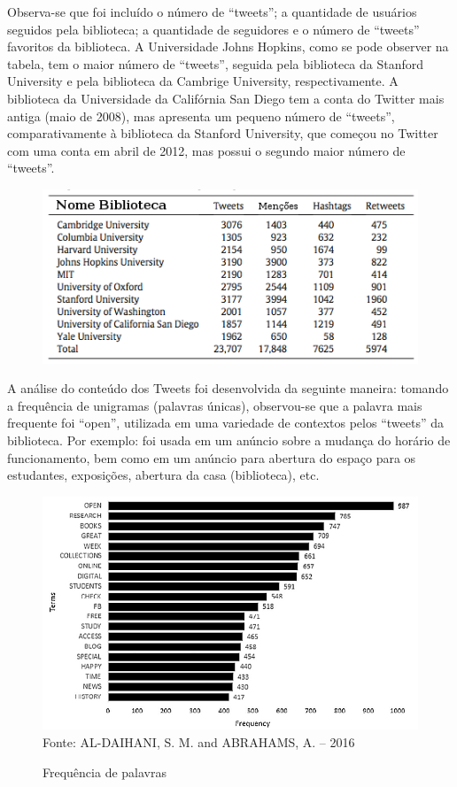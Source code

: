Observa-se que foi incluído o número de ``tweets''; a quantidade de usuários seguidos pela biblioteca; a quantidade de seguidores e o número de ``tweets'' favoritos da biblioteca. A Universidade Johns Hopkins, como se pode observer na tabela, tem o maior número de
``tweets'', seguida pela biblioteca da Stanford University e pela biblioteca da Cambrige University, respectivamente. A biblioteca da Universidade da Califórnia San Diego tem a conta do Twitter mais antiga (maio de 2008), mas apresenta um pequeno número de ``tweets'',
comparativamente à biblioteca da Stanford University, que começou no Twitter com uma conta em abril de 2012, mas possui o segundo maior número de ``tweets''. 


\begin{figure}
\centering
\includegraphics[width=0.7\linewidth]{Figuras/Twitter/contaPalavras}
\caption{}
\label{fig:contaPalavras}
\end{figure}

\pagebreak

A análise do conteúdo dos Tweets foi desenvolvida da seguinte maneira: tomando a frequência de unigramas (palavras únicas), observou-se que a palavra mais frequente foi “open”, utilizada em uma variedade de contextos pelos ``tweets'' da biblioteca. Por exemplo: foi usada em um anúncio sobre a mudança do horário de funcionamento, bem como em um anúncio para abertura do espaço para os estudantes, exposições, abertura da casa (biblioteca), etc. 

\begin{figure}[ht]
	\centering
	\caption{Frequência de palavras}
	\includegraphics[width=0.6\linewidth]{Figuras/Twitter/ferqPalavras}\\
	\tiny Fonte: AL-DAIHANI, S. M. and ABRAHAMS, A. -- 2016
	\label{fig:ferqPalavras}
\end{figure}


